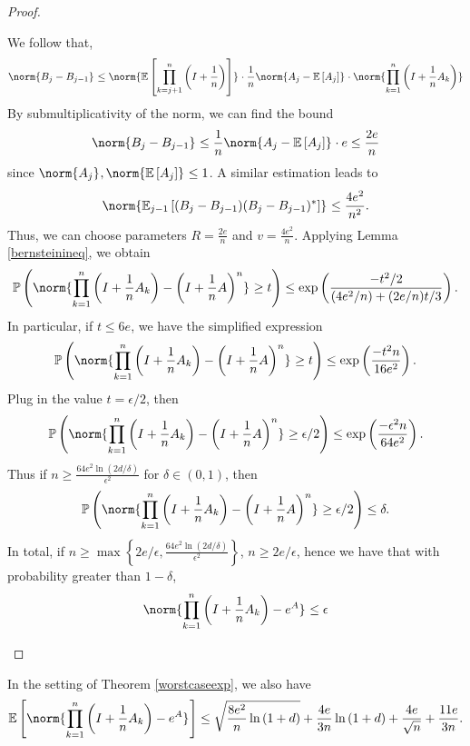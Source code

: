 \begin{proof}
\begin{enumerate}[(i)]
          We follow that,
        \[ \norm{B_j- B_{j-1}}_{} \leq \norm{\mathbb{E}\left[\prod_{k=j+1}^{n}\left(I+\frac{1}{n}\right)\right]}_{} \cdot \frac{1}{n} \norm{A_j-\mathbb{E}\left[A_j\right]}_{} \cdot \norm{\prod_{k=1}^{n}\left(I+\frac{1}{n}A_k\right)}_{}\]
        By submultiplicativity of the norm, we can find the bound 
        \[ \norm{B_j-B_{j-1}}_{} \leq \frac{1}{n} \norm{A_j- \mathbb{E}\left[A_j\right]}_{} \cdot e \leq \frac{2e}{n}\] 
        since \( \norm{A_j}_{}, \norm{\mathbb{E}\left[A_j\right]}_{}\leq 1 \). A similar estimation leads to 
        \[ \norm{\mathbb{E}_{j-1}\left[(B_j-B_{j-1})(B_j-B_{j-1})^{*}\right]}_{} \leq \frac{4e^{2}}{n^{2}}. \]
        Thus, we can choose parameters \( R= \frac{2e}{n} \) and \( v= \frac{4e^{2}}{n} \). Applying Lemma \ref{bernsteinineq}, we obtain
        \[ \mathbb{P}\left(\norm{\prod_{k=1}^{n} \left(I+\frac{1}{n}A_k\right)- \left(I+\frac{1}{n}A\right)^{n}}_{}\geq t \right) \leq \operatorname{exp}\left(\frac{-t^{2}/2}{(4e^{2}/n)+ (2e/n)t/3}\right) .\]
        In particular, if \( t \leq 6e \), we have the simplified expression
        \[ \mathbb{P}\left(\norm{\prod_{k=1}^{n} \left(I+\frac{1}{n}A_k\right)- \left(I+\frac{1}{n}A\right)^{n}}_{}\geq t \right) \leq \operatorname{exp}\left(\frac{-t^{2}n}{16e^{2}}\right).\] Plug in the value \( t= \epsilon/2 \), then 
\[ \mathbb{P}\left(\norm{\prod_{k=1}^{n} \left(I+\frac{1}{n}A_k\right)- \left(I+\frac{1}{n}A\right)^{n}}_{}\geq \epsilon/2 \right) \leq \operatorname{exp}\left(\frac{-\epsilon^{2}n}{64e^{2}}\right).\]
Thus if \( n \geq \frac{64e^{2} \operatorname{ln}(2d/\delta)}{\epsilon^{2}} \) for \( \delta \in (0,1) \), then
\[ \mathbb{P}\left(\norm{ \prod_{k=1}^{n}\left(I+\frac{1}{n}A_k\right)-\left(I+\frac{1}{n}A\right)^{n}}_{} \geq \epsilon/2\right) \leq \delta. \]
In total, if \( n \geq \max \left\{2e/\epsilon,\frac{64e^{2} \operatorname{ln}(2d/\delta)}{\epsilon^{2}} \right\} \), \( n \geq 2 e/\epsilon \), hence we have that with probability greater than \( 1-\delta \),
\[ \norm{\prod_{k=1}^{n} \left(I+\frac{1}{n} A_k\right)-e^{A}}_{} \leq \epsilon \]
    \end{enumerate}
    
\end{proof}


\begin{corl}
    In the setting of Theorem \ref{worstcaseexp}, we also have
    \[ \mathbb{E} \left[\norm{\prod_{k=1}^{n} \left(I+\frac{1}{n}A_k\right)-e^{A}}_{}\right]  \leq \sqrt{\frac{8e^{2}}{n} \operatorname{ln}\left(1+d\right)}+ \frac{4e}{3n}\operatorname{ln}\left(1+d\right) + \frac{4e}{\sqrt{n}} + \frac{11e}{3n}.\]
\end{corl}

